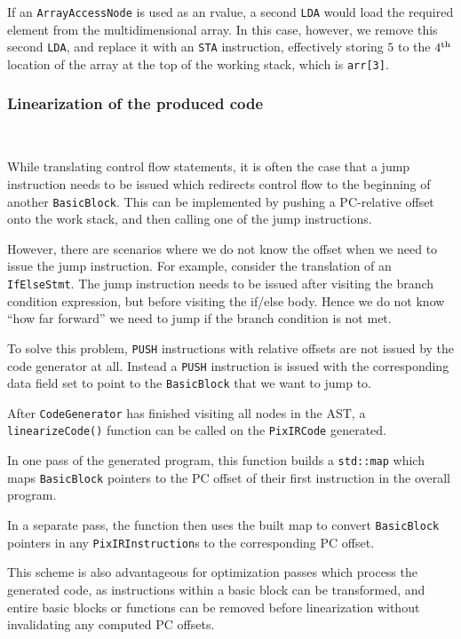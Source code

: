 \documentclass[11pt,a4paper]{scrartcl}
\begin{document}
If an \verb|ArrayAccessNode| is used as an rvalue, a second \verb|LDA| would load the required element from the multidimensional array. In this case, however, we remove this second \verb|LDA|, and replace it with an \verb|STA| instruction, effectively storing $5$ to the $4\textsuperscript{th}$ location of the array at the top of the working stack, which is \verb|arr[3]|.

\subsubsection{Linearization of the produced code}~\label{code-linearization}

While translating control flow statements, it is often the case that a jump instruction needs to be issued which redirects control flow to the beginning of another \verb|BasicBlock|. This can be implemented by pushing a PC-relative offset onto the work stack, and then calling one of the jump instructions.

However, there are scenarios where we do not know the offset when we need to issue the jump instruction. For example, consider the translation of an \verb|IfElseStmt|. The jump instruction needs to be issued after visiting the branch condition expression, but before visiting the if/else body. Hence we do not know ``how far forward'' we need to jump if the branch condition is not met.

To solve this problem, \verb|PUSH| instructions with relative offsets are not issued by the code generator at all. Instead a \verb|PUSH| instruction is issued with the corresponding data field set to point to the \verb|BasicBlock| that we want to jump to.

After \verb|CodeGenerator| has finished visiting all nodes in the AST, a \verb|linearizeCode()| function can be called on the \verb|PixIRCode| generated.

In one pass of the generated program, this function builds a \verb|std::map| which maps \verb|BasicBlock| pointers to the PC offset of their first instruction in the overall program.

In a separate pass, the function then uses the built map to convert \verb|BasicBlock| pointers in any \verb|PixIRInstruction|s to the corresponding PC offset.

This scheme is also advantageous for optimization passes which process the generated code, as instructions within a basic block can be transformed, and entire basic blocks or functions can be removed before linearization without invalidating any computed PC offsets.
\end{document}
